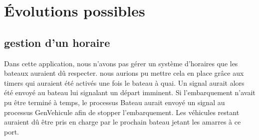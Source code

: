 \documentclass[a4paper, 11pt]{article}
\begin{document}
\section{Évolutions possibles}
	\subsection{gestion d'un horaire}
		Dans cette application, nous n'avons pas gérer un système d'horaires que les bateaux auraient dû respecter. nous aurions pu mettre cela en place grâce aux timers qui auraient été activés une fois le bateau à quai. Un signal aurait alors été envoyé au bateau lui signalant un départ imminent. Si l'embarquement n'avait pu être terminé à temps, le processus Bateau aurait envoyé un signal au processus GenVehicule afin  de stopper l'embarquement. Les véhicules restant auraient dû être pris en charge par le prochain bateau jetant les amarres à ce port.  
\end{document}
